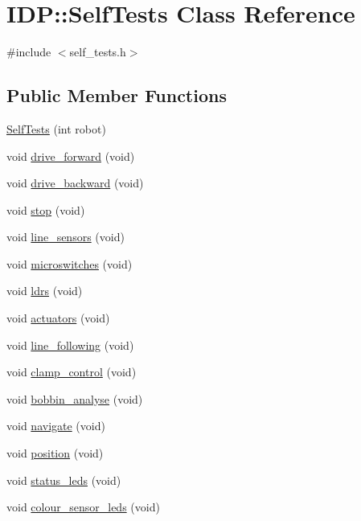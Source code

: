 \hypertarget{classIDP_1_1SelfTests}{
\section{IDP::SelfTests Class Reference}
\label{classIDP_1_1SelfTests}
}


{\ttfamily \#include $<$self\_\-tests.h$>$}

\subsection*{Public Member Functions}
\begin{DoxyCompactItemize}
\item 
\hyperlink{classIDP_1_1SelfTests_a6864b03502cc5d1ac3728b456b04238f}{SelfTests} (int robot)
\item 
void \hyperlink{classIDP_1_1SelfTests_a4ff456e74d55e13599cf64db76bd2ed4}{drive\_\-forward} (void)
\item 
void \hyperlink{classIDP_1_1SelfTests_a38ddef7ecdf9b7dfa69d689c9c1ac8ca}{drive\_\-backward} (void)
\item 
void \hyperlink{classIDP_1_1SelfTests_a33adf462d8c408b1c7b4858e9a4ff000}{stop} (void)
\item 
void \hyperlink{classIDP_1_1SelfTests_aa73ad4de6c1d2b725ed796c10f54ab7c}{line\_\-sensors} (void)
\item 
void \hyperlink{classIDP_1_1SelfTests_a6b2e4d0517de4b73c63f1b1a475b602f}{microswitches} (void)
\item 
void \hyperlink{classIDP_1_1SelfTests_ac0a59273b7756037cb5ffe98e56b931c}{ldrs} (void)
\item 
void \hyperlink{classIDP_1_1SelfTests_a0ca765ac144fafaab502f4326a480486}{actuators} (void)
\item 
void \hyperlink{classIDP_1_1SelfTests_a0a1a40b56fee5249def567bebdb05dc1}{line\_\-following} (void)
\item 
void \hyperlink{classIDP_1_1SelfTests_a896204355ca039660a12e8131578b6c3}{clamp\_\-control} (void)
\item 
void \hyperlink{classIDP_1_1SelfTests_a66f0a3bad277e36b963b2bf3cd5df9dd}{bobbin\_\-analyse} (void)
\item 
void \hyperlink{classIDP_1_1SelfTests_a710347081427c05706f92bdd12f62fbe}{navigate} (void)
\item 
void \hyperlink{classIDP_1_1SelfTests_ada3dfe991573fc6b0922cace927fc4e0}{position} (void)
\item 
void \hyperlink{classIDP_1_1SelfTests_a383fcc33510c20da4759db061caa4681}{status\_\-leds} (void)
\item 
void \hyperlink{classIDP_1_1SelfTests_a874abbdcee115ef97595e5b9e611a297}{colour\_\-sensor\_\-leds} (void)
\end{DoxyCompactItemize}



